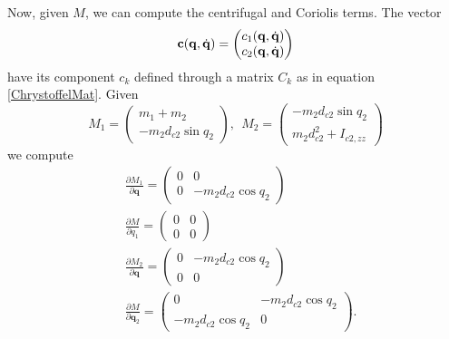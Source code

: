 \documentclass[10pt, a4paper]{report}
\newcommand{\q}{{\mathbf q}}
\begin{document}
\noindent Now, given $M$, we can compute the centrifugal and Coriolis terms. The vector \begin{equation}
    \mathbf c(\q,\dq)=\begin{pmatrix}
        c_1(\q,\dq)\\ 
        c_2(\q,\dq)
    \end{pmatrix}
\end{equation}
have its component $c_k$ defined through a matrix $C_k$ as in equation \eqref{ChrystoffelMat}. Given\begin{equation}
    M_1=\begin{pmatrix}
        m_1+m_2 \\ 
       -m_2d_{c2}\sin q_2
    \end{pmatrix}, \ \ M_2=\begin{pmatrix}
      -m_2d_{c2}\sin q_2\\ 
      m_2d_{c2}^2+I_{c2,zz}
    \end{pmatrix}
\end{equation}
we compute\begin{align}
    &\frac{\partial M_1}{\partial \q}=\begin{pmatrix}
        0&0\\  
        0&-m_2d_{c2}\cos q_2
    \end{pmatrix}\\
     &\frac{\partial M}{\partial q_1}=\begin{pmatrix}
        0&0\\  
        0&0
    \end{pmatrix}\\
     &\frac{\partial M_2}{\partial \q}=\begin{pmatrix}
        0&-m_2d_{c2}\cos q_2\\  
        0&0
    \end{pmatrix}\\
     &\frac{\partial M}{\partial \q_2}=\begin{pmatrix}
        0 & -m_2d_{c2}\cos q_2\\ 
       -m_2d_{c2}\cos q_2& 0
    \end{pmatrix}.
\end{align}
\end{document}
